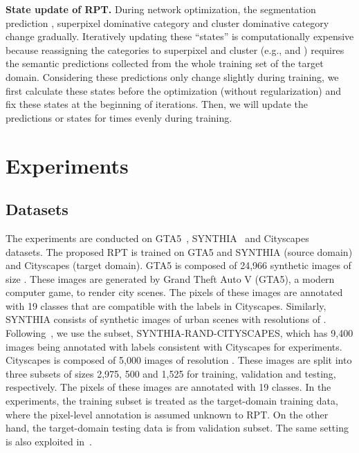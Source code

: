 \documentclass[10pt,twocolumn,letterpaper]{article}
\begin{document}
\textbf{State update of RPT.}
During network optimization, the segmentation prediction , superpixel dominative category  and cluster dominative category  change gradually. Iteratively updating these ``states'' is computationally expensive because reassigning the categories to superpixel and cluster (e.g.,  and ) requires the semantic predictions collected from the whole training set of the target domain. Considering these predictions only change slightly during training, we first calculate these states before the optimization (without regularization) and fix these states at the beginning of iterations. Then, we will update the predictions or states for  times evenly during training.

\vspace{-0.1in}
\section{Experiments}
\vspace{-0.05in}
\subsection{Datasets}
\vspace{-0.05in}
The experiments are conducted on GTA5~\cite{GTA5_richter2016playing}, SYNTHIA~\cite{ros2016synthia} and Cityscapes~\cite{Cordts2016Cityscapes} datasets. The proposed RPT is trained on GTA5 and SYNTHIA (source domain) and Cityscapes (target domain). GTA5 is composed of 24,966 synthetic images of size . These images are generated by Grand Theft Auto V (GTA5), a modern computer game, to render city scenes. The pixels of these images are annotated with 19 classes that are compatible with the labels in Cityscapes. Similarly, SYNTHIA consists of synthetic images of urban scenes with resolutions of . Following~\cite{chang2019all,chen2019learning,hong2018conditional,li2019bidirectional,Tsai_2018_CVPR}, we use the subset, SYNTHIA-RAND-CITYSCAPES, which has 9,400 images being annotated with labels consistent with Cityscapes for experiments. Cityscapes is composed of 5,000 images of resolution . These images are split into three subsets of sizes 2,975, 500 and 1,525 for training, validation and testing, respectively. The pixels of these images are annotated with 19 classes. In the experiments, the training subset is treated as the target-domain training data, where the pixel-level annotation is assumed unknown to RPT. On the other hand, the target-domain testing data is from validation subset. The same setting is also exploited in~\cite{chang2019all,li2019bidirectional,Tsai_2018_CVPR}.
\end{document}
